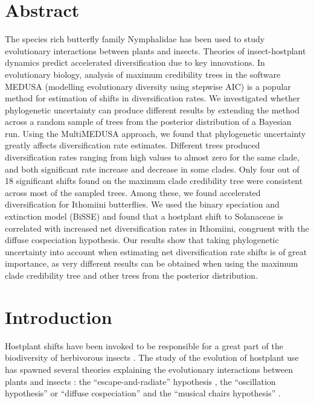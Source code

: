 \documentclass[10pt,letterpaper]{article}
\begin{document}
\section*{Abstract}
The species rich butterfly family Nymphalidae has been used to study
evolutionary interactions between plants and insects. Theories of
insect-hostplant dynamics predict accelerated diversification due to key
innovations. In evolutionary biology, analysis of maximum credibility
trees in the software MEDUSA (modelling evolutionary diversity using
stepwise AIC) is a popular method for estimation of shifts in
diversification rates. We investigated whether phylogenetic uncertainty
can produce different results by extending the method across a random
sample of trees from the posterior distribution of a Bayesian run. Using
the MultiMEDUSA approach, we found that phylogenetic uncertainty greatly
affects diversification rate estimates. Different trees produced
diversification rates ranging from high values to almost zero for the
same clade, and both significant rate increase and decrease in some
clades. Only four out of 18 significant shifts found on the maximum
clade credibility tree were consistent across most of the sampled trees.
Among these, we found accelerated diversification for Ithomiini
butterflies. We used the binary speciation and extinction model (BiSSE)
and found that a hostplant shift to Solanaceae is correlated with
increased net diversification rates in Ithomiini, congruent with the
diffuse cospeciation hypothesis. Our results show that taking
phylogenetic uncertainty into account when estimating net
diversification rate shifts is of great importance, as very different
results can be obtained when using the maximum clade credibility tree
and other trees from the posterior distribution.

\linenumbers

\section*{Introduction}
Hostplant shifts have been invoked to be responsible for a great part of
the biodiversity of herbivorous insects \cite{mitter1988}. The study of the
evolution of hostplant use has spawned several theories explaining the
evolutionary interactions between plants and insects \cite{nyman2012}: the
``escape-and-radiate'' hypothesis \cite{ehrlich1964}, the ``oscillation
hypothesis'' \cite{janz2011, nylin2014} or ``diffuse cospeciation'' \cite{nyman2012} and the
``musical chairs hypothesis'' \cite{hardy2014}.
\end{document}
